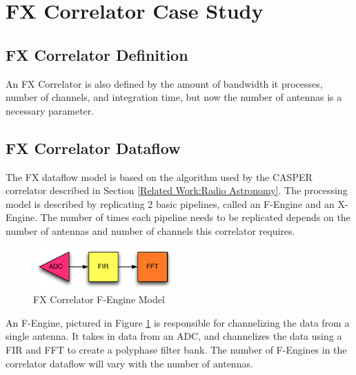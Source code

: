 







\section{FX Correlator Case Study}
\subsection{FX Correlator Definition}
An FX Correlator is also defined by the amount of bandwidth it processes, number of channels, and integration time, but now the number of antennas is a necessary parameter.

\subsection{FX Correlator Dataflow}

The FX dataflow model is based on the algorithm used by the CASPER correlator described in Section \ref{Related Work:Radio Astronomy}. The processing model is described by replicating 2 basic pipelines, called an F-Engine and an X-Engine. The number of times each pipeline needs to be replicated depends on the number of antennas and number of channels this correlator requires.

\begin{figure}[h!]
  \centering
    \includegraphics[width=0.48\textwidth]{Images/C4/fx_f_engine.pdf}
  \caption{FX Correlator F-Engine Model}
  \label{fig: C4/fx_f_engine.pdf}
\end{figure}

An F-Engine, pictured in Figure \ref{fig: C4/fx_f_engine.pdf} is responsible for channelizing the data from a single antenna. 
It takes in data from an ADC, and channelizes the data using a FIR and FFT to create a polyphase filter bank. 
The number of F-Engines in the correlator dataflow will vary with the number of antennas.

